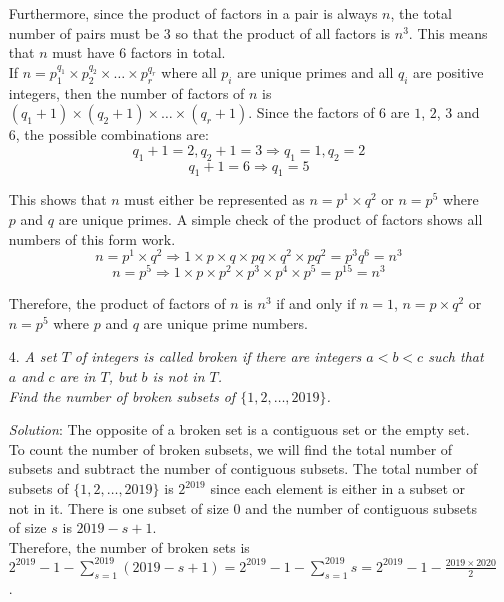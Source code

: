 \documentclass{article}
\begin{document}
\begin{enumerate}[1.]
Furthermore, since the product of factors in a pair is always $n$, the total number of pairs must be $3$ so that the product of all factors is $n^3$. This means that $n$ must have $6$ factors in total.\\

If $n = p_1^{q_1} \times p_2^{q_2} \times \dots \times p_r^{q_r}$ where all $p_i$ are unique primes and all $q_i$ are positive integers, then the number of factors of $n$ is $(q_1 + 1) \times (q_2 + 1) \times \dots \times (q_r + 1)$. Since the factors of $6$ are $1$, $2$, $3$ and $6$, the possible combinations are:
$$q_1 + 1 = 2, q_2 + 1 = 3 \Rightarrow q_1 = 1, q_2 = 2$$
$$q_1 + 1 = 6 \Rightarrow q_1 = 5$$

This shows that $n$ must either be represented as $n = p^1 \times q^2$ or $n = p^5$ where $p$ and $q$ are unique primes. A simple check of the product of factors shows all numbers of this form work.
$$n = p^1 \times q^2 \Rightarrow 1 \times p \times q \times pq \times q^2 \times pq^2 = p^3q^6 = n^3$$
$$n = p^5 \Rightarrow 1 \times p \times p^2 \times p^3 \times p^4 \times p^5 = p^{15} = n^3$$

Therefore, the product of factors of $n$ is $n^3$ if and only if $n = 1$, $n = p \times q^2$ or $n = p^5$ where $p$ and $q$ are unique prime numbers.

\vspace{6.81mm}

\item[4.] %
\textit{A set $T$ of integers is called \textit{broken} if there are integers $a < b < c$ such that $a$ and $c$ are in $T$, but $b$ is not in $T$.\\
Find the number of broken subsets of $\{1, 2, \dots, 2019\}$.}

\textit{Solution}: The opposite of a broken set is a contiguous set or the empty set. To count the number of broken subsets, we will find the total number of subsets and subtract the number of contiguous subsets.
The total number of subsets of $\{1, 2, \dots, 2019\}$ is $2^{2019}$ since each element is either in a subset or not in it. There is one subset of size $0$ and the number of contiguous subsets of size $s$ is $2019 - s + 1$.\\
Therefore, the number of broken sets is $2^{2019} - 1 - \sum_{s=1}^{2019}(2019 - s + 1) = 2^{2019} - 1 - \sum_{s=1}^{2019}s = 2^{2019} - 1 - \frac{2019 \times 2020}{2}$.

\vspace{6.81mm}


\end{enumerate}
\end{document}
